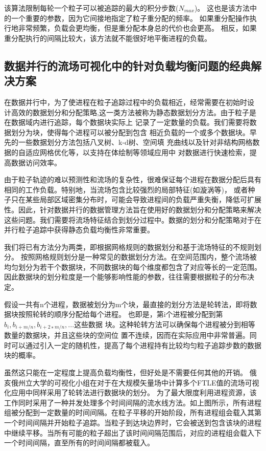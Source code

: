 该算法限制每轮一个粒子可以被追踪的最大的积分步数($N_{max}$)。
这也是该方法中的一个重要的参数，因为它间接地指定了粒子重分配的频率。
如果重分配操作执行地非常频繁，负载会更均衡，但是重分配本身总的代价也会更高。
相反，如果重分配执行的间隔比较大，该方法就不能很好地平衡进程的负载。


\subsection{数据并行的流场可视化中的针对负载均衡问题的经典解决方案}

在数据并行中，为了使进程在粒子追踪过程中的负载相近，经常需要在初始时设 计高效的数据划分和分配策略,这一类方法被称为静态数据划分方法。由于粒子是在数据域内进行追踪，每个数据块实际上 记录了一定数量的负载。我们需要将数据划分为块，使得每个进程可以被分配到包含 相近负载的一个或多个数据块。早先的一些数据划分方法包括八叉树、k-d树、空间填 充曲线以及针对非结构网格数据的自适应网格优化等，以支持在体绘制等领域应用中 对数据进行快速检索，提高数据访问效率。

由于粒子轨迹的难以预测性和流场的复杂性，很难保证每个进程在数据分配后具有相同的工作负载。特别地，当流场包含比较强烈的局部特征(如漩涡等)，
或者种子只在某些局部区域密集分布时，可能会导致进程间的负载严重失衡，降低可扩展性。因此，针对数据并行的数据管理方法旨在使用好的数据划分和分配策略来解决这些问题。我们需要将流场特征结合到划分过程中。数据的划分和分配策略对于在并行粒子追踪中获得静态负载均衡性非常重要。

我们将已有方法分为两类，即根据网格规则的数据划分和基于流场特征的不规则划分。 按照网格规则划分是一种常见的数据划分方法。在空间范围内，整个流场被均匀划分为若干个数据块，不同数据块的每个维度都包含了对应等长的一定范围。因此数据块的划分粒度是一个能够影响性能的参数，往往需要根据粒子的分布决定。

假设一共有n个进程，数据被划分为m个块，最直接的划分方法是轮转法\parencite{PeterkaRNLSKH11}，即将数据块按照轮转的顺序分配给每个进程。
也即是，第i个进程被分配到第${b_{i}, b_{i+m/n}, b_{i+2∗m/n}, . . . }$这些数据 块。这种轮转方法可以确保每个进程被分到相等数量的数据块，并且这些块的空间位 置不连续，因而在实际应用中非常普遍。同时可以通过引入一定的随机性，提高了每个进程持有比较均匀粒子追踪步数的数据块的概率。

虽然这只能在一定程度上提高负载均衡性，但好处是不需要任何其他的开销。
俄亥俄州立大学的可视化小组在对于在大规模矢量场中计算多个FTLE值的流场可视化应用中同样采用了轮转法进行数据块的划分\parencite{NouanesengsyLLSP12}。
为了最大限度利用进程资源，该工作同时采用了一种并发处理多个时间间隔的流水线方法。如上图所示，所有进程组被分配到一定数量的时间间隔。在粒子平移的开始阶段，所有进程组会载入其第一个时间间隔并开始粒子追踪。当粒子到达块边界时，它会被送到包含该块的进程中继续平移。当所有可能的粒子超出了该时间间隔范围后，对应的进程组会载入下一个时间间隔，直至所有的时间间隔都被载入。

